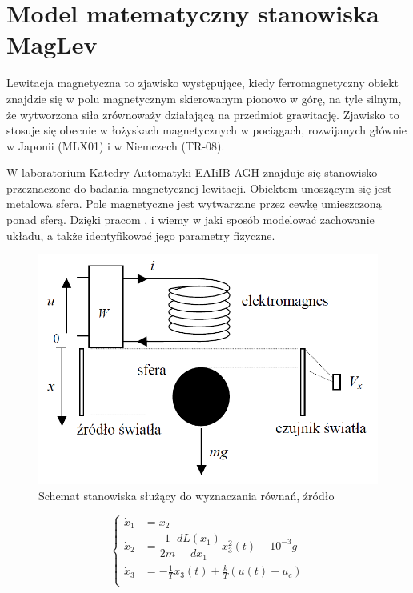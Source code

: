 \section{Model matematyczny stanowiska MagLev}

Lewitacja magnetyczna to zjawisko występujące, kiedy ferromagnetyczny obiekt znajdzie się w polu magnetycznym skierowanym pionowo w górę, na tyle silnym, że wytworzona siła zrównoważy działającą na przedmiot grawitację. Zjawisko to stosuje się obecnie w łożyskach magnetycznych w pociągach, rozwijanych głównie w Japonii (MLX01) i w Niemczech (TR-08).

W laboratorium Katedry Automatyki EAIiIB AGH znajduje się stanowisko przeznaczone do badania magnetycznej lewitacji. Obiektem unoszącym się jest metalowa sfera. Pole magnetyczne jest wytwarzane przez cewkę umieszczoną ponad sferą. Dzięki pracom \cite{Bania1999}, \cite{Bania200.} i \cite{Pilat} wiemy w jaki sposób modelować zachowanie układu, a także identyfikować jego parametry fizyczne.

\begin{figure}[!htb]
\centering
\includegraphics[scale=0.45]{img/model-rownania.PNG}
\caption{Schemat stanowiska służący do wyznaczania równań, źródło \cite{Bania200.}}
\label{rys:model-rownania}
\end{figure}

\begin{equation}\label{modelMagLev}
  \begin{cases}
    \dot x_1 & = x_2 \\
    \dot x_2 & = \dfrac{1}{2m} \dfrac{dL(x_1)}{dx_1} x_3^2(t) + 10^{-3} g  \\
    \dot x_3 & = -\frac{1}{T} x_3(t) + \frac{k}{T} (u(t) + u_c) \\
  \end{cases}  
\end{equation}

